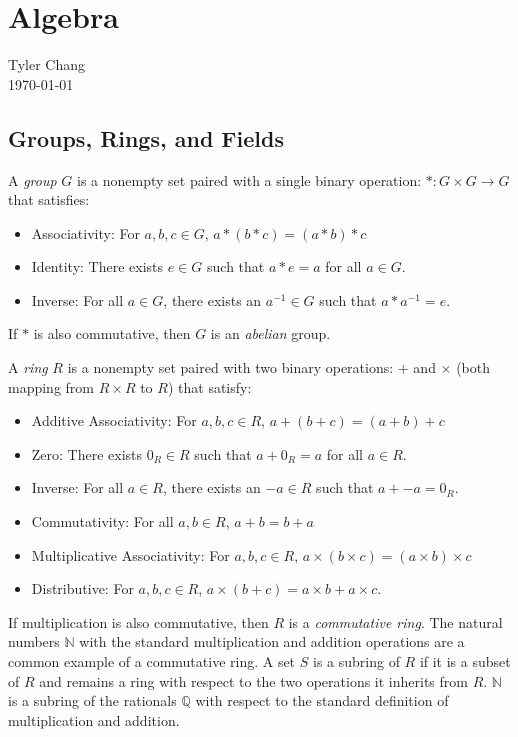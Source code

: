 \documentclass[12pt]{article}
\begin{document}
\section*{Algebra}
Tyler Chang\\
\today

\subsection*{Groups, Rings, and Fields}

A {\it group} $G$ is a nonempty set paired with a single
binary operation: $* : G \times G \rightarrow G$ that satisfies:
\begin{itemize}
\item Associativity: For $a,b,c \in G$, $a *(b *c) = (a * b) * c$
\item Identity: There exists $e \in G$ such that $a * e = a$ for all
$a\in G$.
\item Inverse: For all $a\in G$, there exists an $a^{-1} \in G$
such that $a * a^{-1} = e$.
\end{itemize}
If $*$ is also commutative, then $G$ is an {\it abelian} group.

A {\it ring} $R$ is a nonempty set paired with two binary
operations: $+$ and $\times$ (both mapping from $R\times R$ to $R$)
that satisfy:
\begin{itemize}
\item Additive Associativity: For $a,b,c \in R$, $a +(b +c) = (a + b) + c$
\item Zero: There exists $0_R \in R$ such that $a + 0_R = a$ for all
$a\in R$.
\item Inverse: For all $a\in R$, there exists an $-a \in R$
such that $a + -a = 0_R$.
\item Commutativity: For all $a,b \in R$, $a+b = b+a$
\item Multiplicative Associativity: For $a,b,c \in R$, 
$a \times (b\times c) = (a\times b) \times c$
\item Distributive: For $a,b,c \in R$, 
$a\times(b+c) = a\times b + a\times c$.
\end{itemize}
If multiplication is also commutative, then $R$ is a {\it commutative ring}.
The natural numbers $\mathbb{N}$ with the standard multiplication and 
addition operations are a common example of a commutative ring.
A set $S$ is a subring of $R$ if it is a subset of $R$ and remains a ring
with respect to the two operations it inherits from $R$.
$\mathbb{N}$ is a subring of the rationals $\mathbb{Q}$ with respect
to the standard definition of multiplication and addition.
\end{document}
